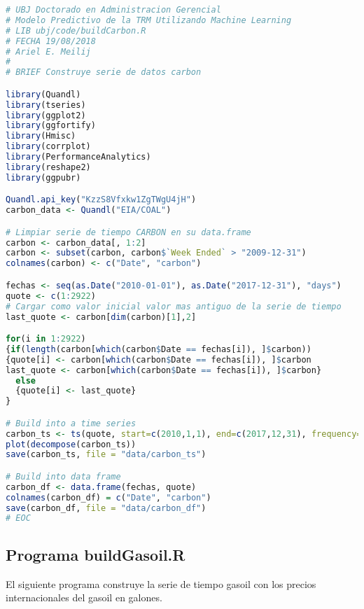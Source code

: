 \begin{lstlisting}[language=R]
# UBJ Doctorado en Administracion Gerencial
# Modelo Predictivo de la TRM Utilizando Machine Learning
# LIB ubj/code/buildCarbon.R 
# FECHA 19/08/2018
# Ariel E. Meilij
#
# BRIEF Construye serie de datos carbon

library(Quandl)
library(tseries)
library(ggplot2)
library(ggfortify)
library(Hmisc)
library(corrplot)
library(PerformanceAnalytics)
library(reshape2)
library(ggpubr)

Quandl.api_key("KzzS8Vfxkw1ZgTWgU4jH")
carbon_data <- Quandl("EIA/COAL")

# Limpiar serie de tiempo CARBON en su data.frame
carbon <- carbon_data[, 1:2]
carbon <- subset(carbon, carbon$`Week Ended` > "2009-12-31")
colnames(carbon) <- c("Date", "carbon")

fechas <- seq(as.Date("2010-01-01"), as.Date("2017-12-31"), "days")
quote <- c(1:2922)
# Cargar como valor inicial valor mas antiguo de la serie de tiempo
last_quote <- carbon[dim(carbon)[1],2]

for(i in 1:2922)
{if(length(carbon[which(carbon$Date == fechas[i]), ]$carbon))
{quote[i] <- carbon[which(carbon$Date == fechas[i]), ]$carbon
last_quote <- carbon[which(carbon$Date == fechas[i]), ]$carbon}
  else
  {quote[i] <- last_quote}
}

# Build into a time series
carbon_ts <- ts(quote, start=c(2010,1,1), end=c(2017,12,31), frequency=365)
plot(decompose(carbon_ts))
save(carbon_ts, file = "data/carbon_ts")

# Build into data frame
carbon_df <- data.frame(fechas, quote)
colnames(carbon_df) = c("Date", "carbon")
save(carbon_df, file = "data/carbon_df")
# EOC
\end{lstlisting}

\subsection{Programa buildGasoil.R}
El siguiente programa construye la serie de tiempo gasoil con los precios internacionales del gasoil en galones.

